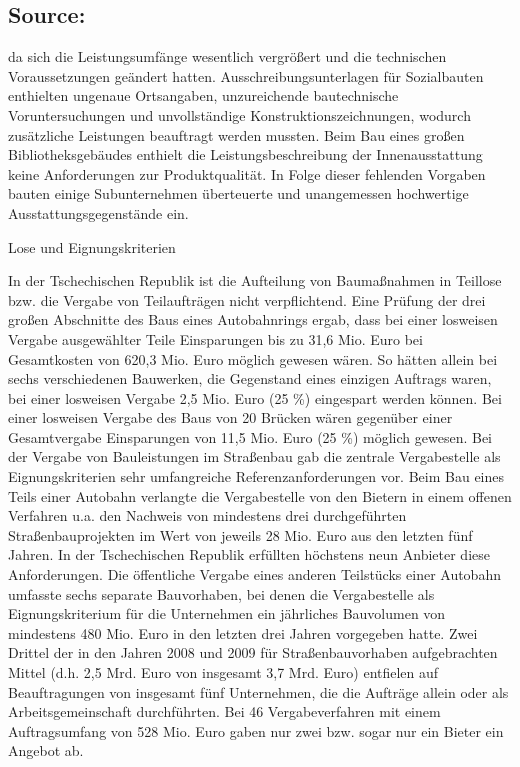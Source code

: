 \documentclass[10pt]{article}
\begin{document}
\subsection*{Source:}

da sich die Leistungsumfänge wesentlich vergrößert und die technischen Voraussetzungen geändert hatten.
Ausschreibungsunterlagen für Sozialbauten enthielten ungenaue Ortsangaben, unzureichende bautechnische Voruntersuchungen und unvollständige Konstruktionszeichnungen, wodurch zusätzliche Leistungen beauftragt werden mussten.
Beim Bau eines großen Bibliotheksgebäudes enthielt die Leistungsbeschreibung der Innenausstattung keine Anforderungen zur Produktqualität.
In Folge dieser fehlenden Vorgaben bauten einige Subunternehmen überteuerte und unangemessen hochwertige Ausstattungsgegenstände ein.


Lose und Eignungskriterien

In der Tschechischen Republik ist die Aufteilung von Baumaßnahmen in Teillose bzw. die Vergabe von Teilaufträgen nicht verpflichtend.
Eine Prüfung der drei großen Abschnitte des Baus eines Autobahnrings ergab, dass bei einer losweisen Vergabe ausgewählter Teile Einsparungen bis zu 31,6 Mio. Euro bei Gesamtkosten von 620,3 Mio. Euro möglich gewesen wären.
So hätten allein bei sechs verschiedenen Bauwerken, die Gegenstand eines einzigen Auftrags waren, bei einer losweisen Vergabe 2,5 Mio. Euro (25 \%) eingespart werden können.
Bei einer losweisen Vergabe des Baus von 20 Brücken wären gegenüber einer Gesamtvergabe Einsparungen von 11,5 Mio. Euro (25 \%) möglich gewesen.
Bei der Vergabe von Bauleistungen im Straßenbau gab die zentrale Vergabestelle als Eignungskriterien sehr umfangreiche Referenzanforderungen vor.
Beim Bau eines Teils einer Autobahn verlangte die Vergabestelle von den Bietern in einem offenen Verfahren u.a. den Nachweis von mindestens drei durchgeführten Straßenbauprojekten im Wert von jeweils 28 Mio. Euro aus den letzten fünf Jahren.
In der Tschechischen Republik erfüllten höchstens neun Anbieter diese Anforderungen.
Die öffentliche Vergabe eines anderen Teilstücks einer Autobahn umfasste sechs separate Bauvorhaben, bei denen die Vergabestelle als Eignungskriterium für die Unternehmen ein jährliches Bauvolumen von mindestens 480 Mio. Euro in den letzten drei Jahren vorgegeben hatte.
Zwei Drittel der in den Jahren 2008 und 2009 für Straßenbauvorhaben aufgebrachten Mittel (d.h. 2,5 Mrd. Euro von insgesamt 3,7 Mrd. Euro) entfielen auf Beauftragungen von insgesamt fünf Unternehmen, die die Aufträge allein oder als Arbeitsgemeinschaft durchführten.
Bei 46 Vergabeverfahren mit einem Auftragsumfang von 528 Mio. Euro gaben nur zwei bzw. sogar nur ein Bieter ein Angebot ab.
\end{document}
